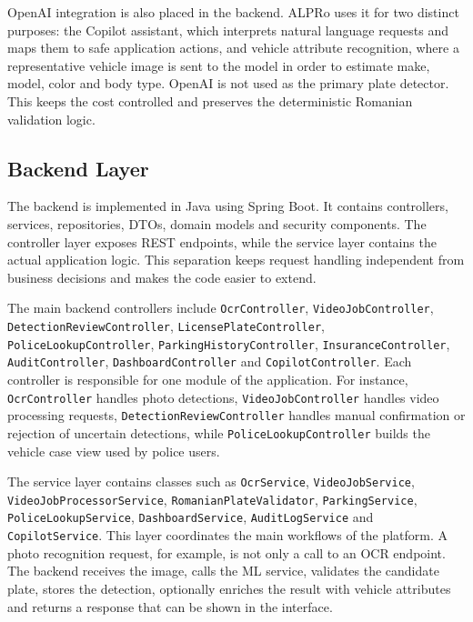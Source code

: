 ﻿\documentclass[12pt,a4paper]{article}
\begin{document}
OpenAI integration is also placed in the backend. ALPRo uses it for two distinct purposes: the Copilot assistant, which interprets natural language requests and maps them to safe application actions, and vehicle attribute recognition, where a representative vehicle image is sent to the model in order to estimate make, model, color and body type. OpenAI is not used as the primary plate detector. This keeps the cost controlled and preserves the deterministic Romanian validation logic.

\subsection{Backend Layer}

The backend is implemented in Java using Spring Boot. It contains controllers, services, repositories, DTOs, domain models and security components. The controller layer exposes REST endpoints, while the service layer contains the actual application logic. This separation keeps request handling independent from business decisions and makes the code easier to extend.

The main backend controllers include \texttt{OcrController}, \texttt{VideoJobController}, \texttt{DetectionReviewController}, \texttt{LicensePlateController}, \texttt{PoliceLookupController}, \texttt{ParkingHistoryController}, \texttt{InsuranceController}, \texttt{AuditController}, \texttt{DashboardController} and \texttt{CopilotController}. Each controller is responsible for one module of the application. For instance, \texttt{OcrController} handles photo detections, \texttt{VideoJobController} handles video processing requests, \texttt{DetectionReviewController} handles manual confirmation or rejection of uncertain detections, while \texttt{PoliceLookupController} builds the vehicle case view used by police users.

The service layer contains classes such as \texttt{OcrService}, \texttt{VideoJobService}, \texttt{VideoJobProcessorService}, \texttt{RomanianPlateValidator}, \texttt{ParkingService}, \texttt{PoliceLookupService}, \texttt{DashboardService}, \texttt{AuditLogService} and \texttt{CopilotService}. This layer coordinates the main workflows of the platform. A photo recognition request, for example, is not only a call to an OCR endpoint. The backend receives the image, calls the ML service, validates the candidate plate, stores the detection, optionally enriches the result with vehicle attributes and returns a response that can be shown in the interface.
\end{document}
